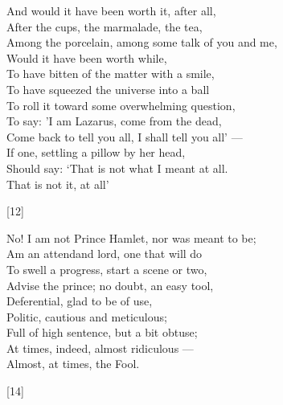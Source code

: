 \documentclass[twoside]{article}
\begin{document}
\begin{multicols}{2}
\begin{minipage}{9cm}
\begin{turn}{75}
    \begin{minipage}{9cm}
        \begin{flushright}
        \centering
        \onehalfspacing
        And would it have been worth it, after all,\\
        After the cups, the marmalade, the tea,\\
        Among the porcelain, among some talk of you and me,\\
        Would it have been worth while,\\
        To have bitten of the matter with a smile,\\
        To have squeezed the universe into a ball\\
        To roll it toward some overwhelming question,\\
        To say: 'I am Lazarus, come from the dead, \\
        Come back to tell you all, I shall tell you all' ---\\
        If one, settling a pillow by her head,\\
        \quad{} Should say: `That is not what I meant at all.\\
        \quad{} That is not it, at all'
        \begin{center}[12]\end{center}
        \end{flushright}
    \end{minipage}
\end{turn}

\begin{minipage}{8cm}
    \flushright
    No! I am not Prince Hamlet, nor was meant to be;\\
    Am an attendand lord, one that will do\\
    To swell a progress, start a scene or two,\\
    Advise the prince; no doubt, an easy tool,\\
    Deferential, glad to be of use,\\
    Politic, cautious and meticulous;\\
    Full of high sentence, but a bit obtuse;\\
    At times, indeed, almost ridiculous ---\\
    Almost, at times, the Fool.\\
    \begin{center}[14]\end{center}
\end{minipage}

\end{minipage}

\end{multicols}
\end{document}
